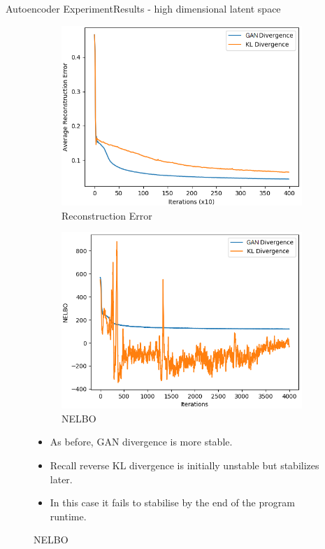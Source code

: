 \documentclass{beamer}
\begin{document}
\begin{frame}{Autoencoder Experiment}{Results - high dimensional latent space}
\begin{figure}
\begin{subfigure}{0.49\textwidth}
\includegraphics[width=\linewidth]{part4reconerrors/PCADVvsPCKLD.png}
\caption{Reconstruction Error}
\end{subfigure}
\begin{subfigure}{0.49\textwidth}
\includegraphics[width=\linewidth]{part4nelbos/PCADVvsPCKLD.png}
\caption{NELBO}
\end{subfigure}
\begin{itemize}
\item As before, GAN divergence is more stable.
\item Recall reverse KL divergence is initially unstable but stabilizes later.
\item In this case it fails to stabilise by the end of the program runtime.
\end{itemize}
\end{figure}

\end{frame}
\end{document}
